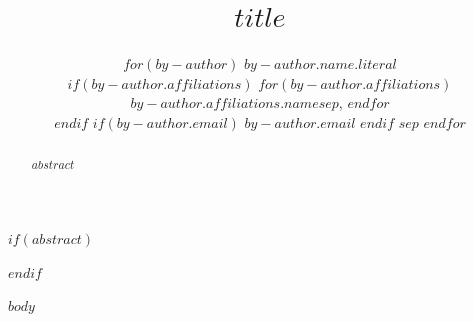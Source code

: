 \documentclass[11pt]{article}
\date{}
\title{$title$}
\author{
$for(by-author)$
  $by-author.name.literal$ \\
  $if(by-author.affiliations)$
    $for(by-author.affiliations)$$by-author.affiliations.name$$sep$, $endfor$ \\
  $endif$
  $if(by-author.email)$
    \texttt{$by-author.email$}
  $endif$
  $sep$ \And
$endfor$
}
\begin{document}
\maketitle

$if(abstract)$
\begin{abstract}
$abstract$
\end{abstract}
$endif$

$body$
\end{document}
